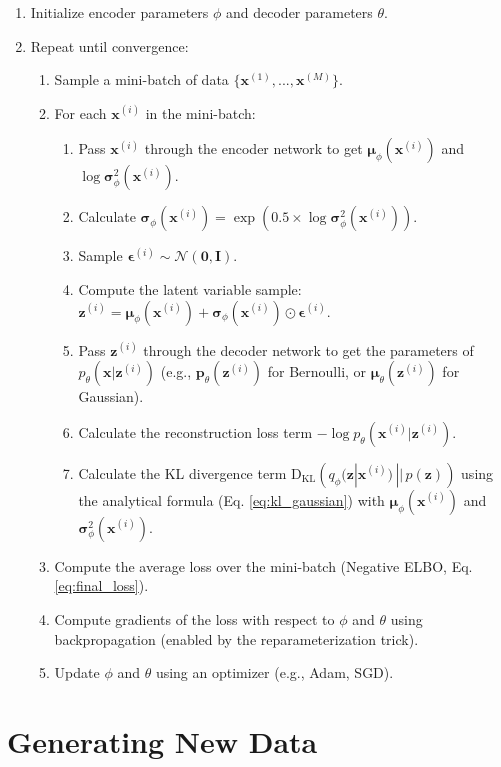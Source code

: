 \documentclass[11pt, letterpaper]{article}
\newcommand{\vx}{\boldsymbol{x}} %
\newcommand{\vz}{\boldsymbol{z}} %
\newcommand{\vepsilon}{\boldsymbol{\epsilon}} %
\newcommand{\vmu}{\boldsymbol{\mu}} %
\newcommand{\vsigma}{\boldsymbol{\sigma}} %
\newcommand{\mI}{\boldsymbol{I}} %
\newcommand{\KL}[2]{\text{D}_{\text{KL}}\left(#1 \,||\, #2\right)} %
\newcommand{\Ndist}{\mathcal{N}} %
\begin{document}
\begin{enumerate}
    \item Initialize encoder parameters $\phi$ and decoder parameters $\theta$.
    \item Repeat until convergence:
    \begin{enumerate}
        \item Sample a mini-batch of data $\{\vx^{(1)}, ..., \vx^{(M)}\}$.
        \item For each $\vx^{(i)}$ in the mini-batch:
        \begin{enumerate}
            \item Pass $\vx^{(i)}$ through the encoder network to get $\vmu_{\phi}(\vx^{(i)})$ and $\log \vsigma^2_{\phi}(\vx^{(i)})$.
            \item Calculate $\vsigma_{\phi}(\vx^{(i)}) = \exp(0.5 \times \log \vsigma^2_{\phi}(\vx^{(i)}))$.
            \item Sample $\vepsilon^{(i)} \sim \Ndist(\mathbf{0}, \mI)$.
            \item Compute the latent variable sample: $\vz^{(i)} = \vmu_{\phi}(\vx^{(i)}) + \vsigma_{\phi}(\vx^{(i)}) \odot \vepsilon^{(i)}$.
            \item Pass $\vz^{(i)}$ through the decoder network to get the parameters of $p_{\theta}(\vx|\vz^{(i)})$ (e.g., $\boldsymbol{p}_{\theta}(\vz^{(i)})$ for Bernoulli, or $\vmu_{\theta}(\vz^{(i)})$ for Gaussian).
            \item Calculate the reconstruction loss term $-\log p_{\theta}(\vx^{(i)}|\vz^{(i)})$.
            \item Calculate the KL divergence term $\KL{q_{\phi}(\vz|\vx^{(i)})}{p(\vz)}$ using the analytical formula (Eq. \ref{eq:kl_gaussian}) with $\vmu_{\phi}(\vx^{(i)})$ and $\vsigma^2_{\phi}(\vx^{(i)})$.
        \end{enumerate}
        \item Compute the average loss over the mini-batch (Negative ELBO, Eq. \ref{eq:final_loss}).
        \item Compute gradients of the loss with respect to $\phi$ and $\theta$ using backpropagation (enabled by the reparameterization trick).
        \item Update $\phi$ and $\theta$ using an optimizer (e.g., Adam, SGD).
    \end{enumerate}
\end{enumerate}

\section{Generating New Data}
\end{document}
